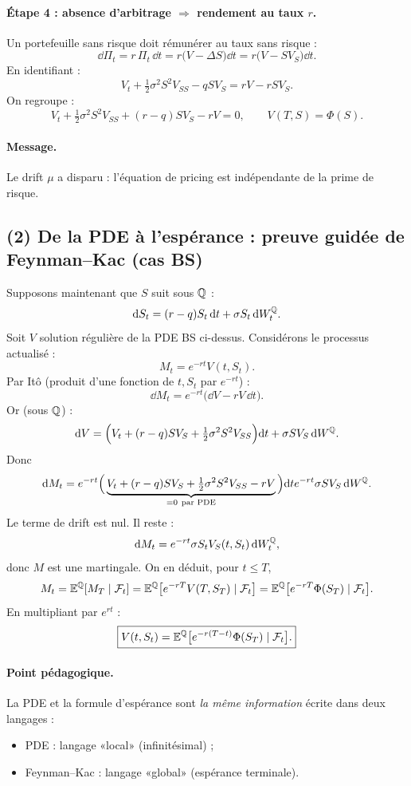 \paragraph{Étape 4 : absence d'arbitrage $\Rightarrow$ rendement au taux $r$.}
Un portefeuille sans risque doit rémunérer au taux sans risque :
\[
\dd \Pi_t = r\,\Pi_t\,\dd t = r\big(V-\Delta S\big)\dd t=r\big(V-SV_S\big)\dd t.
\]
En identifiant :
\[
V_t+\tfrac12\sigma^2S^2V_{SS}-qSV_S = rV-rSV_S.
\]
On regroupe :
\[
\boxed{
V_t+\tfrac12\sigma^2S^2V_{SS}+(r-q)SV_S-rV=0,
}
\qquad V(T,S)=\Phi(S).
\]
\paragraph{Message.}
Le drift $\mu$ a disparu : l'équation de pricing est indépendante de la prime de risque.

\subsection*{(2) De la PDE à l'espérance : preuve guidée de Feynman--Kac (cas BS)}
Supposons maintenant que $S$ suit sous $\mathbb{Q}$ :
\[
\mathrm{d} S_t=(r-q)S_t\,\mathrm{d} t+\sigma S_t\,\mathrm{d} W_t^{\mathbb{Q}}.
\]
Soit $V$ solution régulière de la PDE BS ci-dessus.
Considérons le processus actualisé :
\[
M_t=e^{-rt}V(t,S_t).
\]
Par Itô (produit d'une fonction de $t,S_t$ par $e^{-rt}$) :
\[
\dd M_t = e^{-rt}\Big(\dd V-rV\,\dd t\Big).
\]
Or (sous $\mathbb{Q}$) :
\[
\mathrm{d} V=\Big(V_t+(r-q)SV_S+\tfrac12\sigma^2S^2V_{SS}\Big)\mathrm{d} t+\sigma SV_S\,\mathrm{d} W^{\mathbb{Q}}.
\]
Donc
\[
\dd M_t=e^{-rt}\Big(\underbrace{V_t+(r-q)SV_S+\tfrac12\sigma^2S^2V_{SS}-rV}_{=0\ \text{par PDE}}\Big)\dd t
e^{-rt}\sigma SV_S\,\dd W^{\Qmeas}.
\]
Le terme de drift est nul. Il reste :
\[
\mathrm{d} M_t=e^{-rt}\sigma S_tV_S(t,S_t)\,\mathrm{d} W_t^{\mathbb{Q}},
\]
donc $M$ est une martingale.
On en déduit, pour $t\le T$,
\[
M_t=\mathbb{E}^{\mathbb{Q}}[M_T\mid \mathcal{F}_t]
=\mathbb{E}^{\mathbb{Q}}\big[e^{-rT}V(T,S_T)\mid \mathcal{F}_t\big]
=\mathbb{E}^{\mathbb{Q}}\big[e^{-rT}\Phi(S_T)\mid \mathcal{F}_t\big].
\]
En multipliant par $e^{rt}$ :
\[
\boxed{
V(t,S_t)=\mathbb{E}^{\mathbb{Q}}\big[e^{-r(T-t)}\Phi(S_T)\mid \mathcal{F}_t\big].
}
\]
\paragraph{Point pédagogique.}
La PDE et la formule d'espérance sont \emph{la même information} écrite dans deux langages :
\begin{itemize}[leftmargin=*]
\item PDE : langage «local» (infinitésimal) ;
\item Feynman--Kac : langage «global» (espérance terminale).
\end{itemize}

